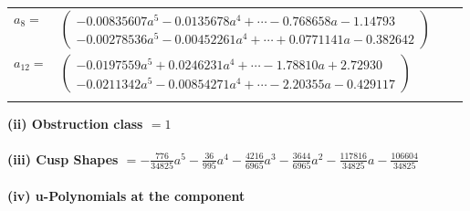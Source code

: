 \documentclass[1p]{elsarticle_modified}
\theoremstyle{definition}
\begin{document}
\begin{tabular}{m{7pt} m{180pt} m{7pt} m{180pt} }
\flushright $a_{8}=$&$\begin{pmatrix}-0.00835607 a^{5}-0.0135678 a^{4}+\cdots-0.768658 a-1.14793\\-0.00278536 a^{5}-0.00452261 a^{4}+\cdots+0.0771141 a-0.382642\end{pmatrix}$ \\
\flushright $a_{12}=$&$\begin{pmatrix}-0.0197559 a^{5}+0.0246231 a^{4}+\cdots-1.78810 a+2.72930\\-0.0211342 a^{5}-0.00854271 a^{4}+\cdots-2.20355 a-0.429117\end{pmatrix}$\\&\end{tabular}
\flushleft \textbf{(ii) Obstruction class $= 1$}\\~\\
\flushleft \textbf{(iii) Cusp Shapes $= -\frac{776}{34825} a^5-\frac{36}{995} a^4-\frac{4216}{6965} a^3-\frac{3644}{6965} a^2-\frac{117816}{34825} a-\frac{106604}{34825}$}\\~\\
\newpage\renewcommand{\arraystretch}{1}
\flushleft \textbf{(iv) u-Polynomials at the component}\newline \\
\end{document}
